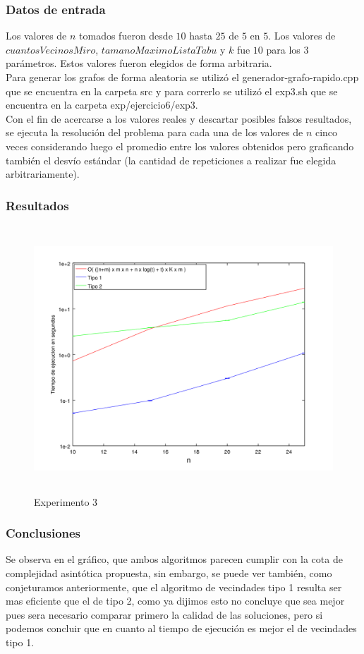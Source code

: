 \subsubsection*{Datos de entrada}\;
    \noindent Los valores de $n$ tomados fueron desde $10$ hasta $25$ de $5$ en $5$. Los valores de $cuantosVecinosMiro$, $tamanoMaximoListaTabu$ y $k$ fue $10$ para los $3$ parámetros. Estos valores fueron elegidos de forma arbitraria. \\
        Para generar los grafos de forma aleatoria se utilizó el generador-grafo-rapido.cpp que se encuentra en la carpeta src y para correrlo se utilizó el exp3.sh que se encuentra en la carpeta exp/ejercicio6/exp3. \\
        Con el fin de acercarse a los valores reales y descartar posibles falsos resultados, se ejecuta la resolución del problema para cada una de los valores de $n$ cinco veces considerando luego el promedio entre los valores obtenidos pero graficando también el desvío estándar (la cantidad de repeticiones a realizar fue elegida arbitrariamente).\; 

\subsubsection*{Resultados}\;

    \begin{figure}[H]
      \includegraphics[height=10cm]{graficos/ejercicio6-exp3.png}
       \caption{Experimento 3}
	\end{figure}


\subsubsection*{Conclusiones}\;
Se observa en el gráfico, que ambos algoritmos parecen cumplir con la cota de complejidad asintótica propuesta, sin embargo, se puede ver también, como conjeturamos anteriormente, que el algoritmo de vecindades tipo 1 resulta ser mas eficiente que el de tipo 2, como ya dijimos esto no concluye que sea mejor pues sera necesario comparar primero la calidad de las soluciones, pero si podemos concluir que en cuanto al tiempo de ejecución es mejor el de vecindades tipo 1.


